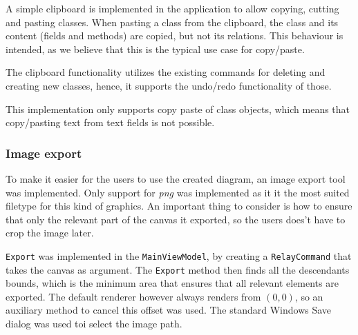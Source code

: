 A simple clipboard is implemented in the
application to allow copying, cutting and pasting classes. When pasting a class
from the clipboard, the class and its content (fields and methods) are copied,
but not its relations. This behaviour is intended, as we believe that this is
the typical use case for copy/paste.

The clipboard functionality utilizes the existing commands for deleting and
creating new classes, hence, it supports the undo/redo functionality of
those.

This implementation only supports copy paste of class objects, which means that 
copy/pasting text from text fields is not possible.

\subsubsection{Image export}

To make it easier for the users to use the created diagram, an image export tool
was implemented. Only support for \textit{png} was implemented as it it
the most suited filetype for this kind of graphics. An important thing to consider
is how to ensure that only the relevant part of the canvas it exported, so
the users does't have to crop the image later.

\texttt{Export} was implemented in the \texttt{MainViewModel}, by creating a
\texttt{RelayCommand} that takes the canvas as argument.
The \texttt{Export} method then finds all the  descendants bounds, which is 
the minimum area that ensures that all relevant elements are exported. The
default renderer however always renders from $(0,0)$, so an auxiliary method to
cancel this offset was used. The standard Windows Save dialog was used toi
select the image path.

